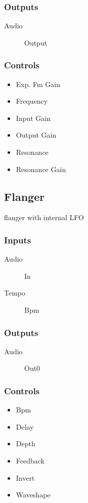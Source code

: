 \subsubsection{Outputs}
\begin{description}
\item [Audio] Output
\end{description}

\subsubsection{Controls}
\begin{itemize}
\item Exp. Fm Gain
\item Frequency
\item Input Gain
\item Output Gain
\item Resonance
\item Resonance Gain
\end{itemize}

\subsection{Flanger}

flanger with internal LFO



\subsubsection{Inputs}
\begin{description}
\item [Audio] In
\item [Tempo] Bpm
\end{description}

\subsubsection{Outputs}
\begin{description}
\item [Audio] Out0
\end{description}

\subsubsection{Controls}
\begin{itemize}
\item Bpm
\item Delay
\item Depth
\item Feedback
\item Invert
\item Waveshape
\end{itemize}

